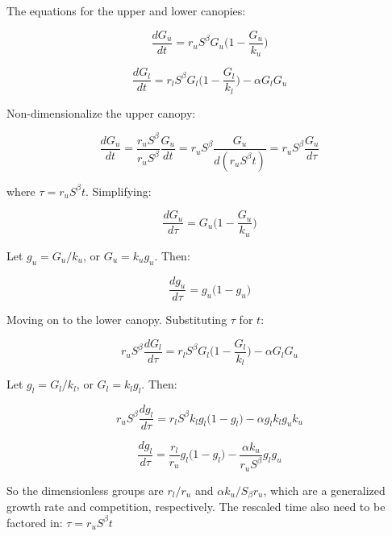 \documentclass{article}
\begin{document}
The equations for the upper and lower canopies:

\begin{equation*}
	 \frac{d G_u}{dt} =
	 r_u S^\beta G_u \bigg(1-\frac{G_u}{k_u}\bigg)
\end{equation*}


\begin{equation*}
	 \frac{d G_l}{dt} = r_l S^\beta G_l \bigg(1-\frac{G_l}{k_l}\bigg) - \alpha G_l G_u
\end{equation*}

Non-dimensionalize the upper canopy:

\begin{equation*}
    \frac{d G_u}{dt} =
     \frac{r_u S^\beta}{r_u S^\beta} \frac{G_u}{dt} =
  	{r_u S^\beta} \frac{G_u}{d(r_u S^\beta t)} =
	r_u S^\beta \frac{G_u}{d \tau}
\end{equation*}

where $\tau = r_u S^\beta t$.  Simplifying:

\begin{equation*}
    \frac{d G_u}{d\tau} =
    G_u \bigg(1-\frac{G_u}{k_u}\bigg)
\end{equation*}


Let  $g_u = G_u/k_u$, or   $G_u =   k_u g_u$.  Then:

\begin{equation*}
  \frac{d   g_u}{d\tau} =
	 g_u \bigg(1 -  g_u \bigg)
\end{equation*}

Moving on to the lower canopy.  Substituting $\tau$ for $t$:

\begin{equation*}
	 r_u S^\beta \frac{d G_l}{d \tau } = r_l S^\beta G_l \bigg(1-\frac{G_l}{k_l}\bigg) - \alpha G_l G_u
\end{equation*}

Let  $g_l = G_l/k_l$, or   $G_l =   k_l g_l$.  Then:

\begin{equation*}
r_u   S^\beta \frac{d g_l}{d \tau } = r_l S^\beta k_l g_l \big(1-g_l \big) - \alpha g_l k_l g_u k_u
\end{equation*}

\begin{equation*}
 \frac{d g_l}{d \tau } =\frac{ r_l}{r_u }  g_l \big(1-g_l \big) - \frac{\alpha k_u}{r_u  S^\beta}  g_l g_u
\end{equation*}

So the dimensionless groups are $r_l/r_u$ and $\alpha k_u / S_\beta r_u$, which are a generalized growth rate and competition, respectively.  The rescaled time also need to be factored in:  $\tau = r_u S^\beta t$
\end{document}
